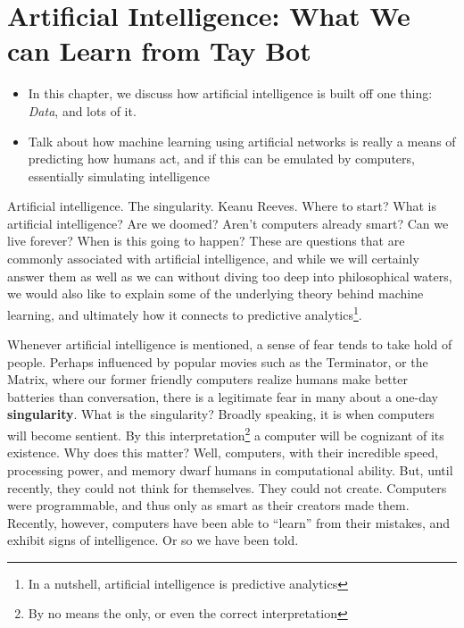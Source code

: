 \documentclass[12pt,twoside]{book}
\newcommand{\imp}[1]{\textbf{#1}}
\begin{document}
	\chapter[Rise of the Bots]{Artificial Intelligence: What We can Learn from Tay Bot}
	\begin{itemize}
		\item In this chapter, we discuss how artificial intelligence is built off one thing: \emph{Data}, and lots of it.
		\item Talk about how machine learning using artificial networks is really a means of predicting how humans act, and if this can be emulated by computers, essentially simulating intelligence
	\end{itemize}
	Artificial intelligence.  The singularity.  Keanu Reeves.  Where to start?  What is artificial intelligence?  Are we doomed?  Aren't computers already smart?  Can we live forever?  When is this going to happen? These are questions that are commonly associated with artificial intelligence, and while we will certainly answer them as well as we can without diving too deep into philosophical waters, we would also like to explain some of the underlying theory behind machine learning, and ultimately how it connects to predictive analytics\footnote{In a nutshell, artificial intelligence is predictive analytics}.  
	
	Whenever artificial intelligence is mentioned, a sense of fear tends to take hold of people.  Perhaps influenced by popular movies such as the Terminator, or the Matrix, where our former friendly computers realize humans make better batteries than conversation, there is a legitimate fear in many about a one-day \imp{singularity}. What is the singularity?  Broadly speaking, it is when computers will become sentient.  By this interpretation\footnote{By no means the only, or even the correct interpretation}  a computer will be cognizant of its existence.  Why does this matter?  Well, computers, with their incredible speed, processing power, and memory dwarf humans in computational ability.  But, until recently, they could not think for themselves.  They could not create.  Computers were programmable, and thus only as smart as their creators made them.  Recently, however, computers have been able to ``learn'' from their mistakes, and exhibit signs of intelligence. Or so we have been told.  
	
\end{document}
